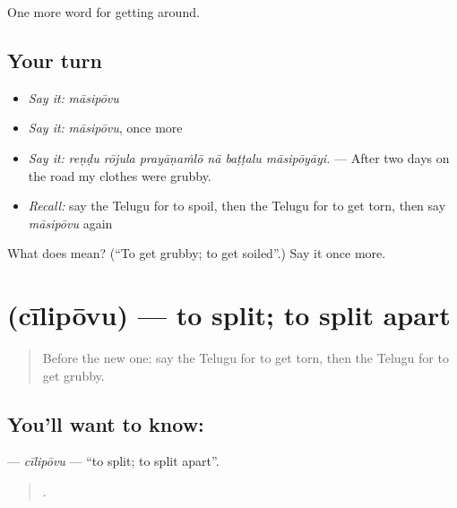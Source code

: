 \begin{grammarlens}[title={What you've built}]
One more word for getting around.
\end{grammarlens}

\subsection*{Your turn}
\begin{itemize}
\raggedright
  \item \emph{Say it:} \emph{māsipōvu}
  \item \emph{Say it:} \emph{māsipōvu}, once more
  \item \emph{Say it:} \emph{reṇḍu rōjula prayāṇaṁlō nā baṭṭalu māsipōyāyi.} — After two days on the road my clothes were grubby.
  \item \emph{Recall:} say the Telugu for to spoil, then the Telugu for to get torn, then say \emph{māsipōvu} again
\end{itemize}

\begin{tcolorbox}[breakable,colback=teal!4,colframe=teal!35!black,title={Before you move on}]
What does  mean? (\textquotedblleft{}To get grubby; to get soiled\textquotedblright{}.) Say it once more.
\end{tcolorbox}
\section[\texorpdfstring{\te{చీలిపోవు} (cīlipōvu)}{చీలిపోవు (cīlipōvu)}]{ (cīlipōvu) — to split; to split apart}

\label{lesson:TE-C490-cilipovu}



\begin{quote}
Before the new one: say the Telugu for to get torn, then the Telugu for to get grubby.
\end{quote}

\subsection*{You'll want to know: }
\textbf{} — \emph{cīlipōvu} — \textquotedblleft{}to split; to split apart\textquotedblright{}.

\begin{quote}
   .
\end{quote}

